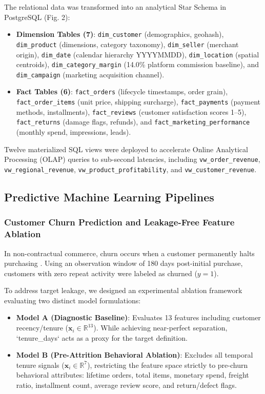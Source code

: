 \documentclass[conference]{IEEEtran}
\begin{document}
The relational data was transformed into an analytical Star Schema in PostgreSQL (Fig. 2):
\begin{itemize}
    \item \textbf{Dimension Tables (7)}: \texttt{dim\_customer} (demographics, geohash), \texttt{dim\_product} (dimensions, category taxonomy), \texttt{dim\_seller} (merchant origin), \texttt{dim\_date} (calendar hierarchy YYYYMMDD), \texttt{dim\_location} (spatial centroids), \texttt{dim\_category\_margin} (14.0\% platform commission baseline), and \texttt{dim\_campaign} (marketing acquisition channel).
    \item \textbf{Fact Tables (6)}: \texttt{fact\_orders} (lifecycle timestamps, order grain), \texttt{fact\_order\_items} (unit price, shipping surcharge), \texttt{fact\_payments} (payment methods, installments), \texttt{fact\_reviews} (customer satisfaction scores 1--5), \texttt{fact\_returns} (damage flags, refunds), and \texttt{fact\_marketing\_performance} (monthly spend, impressions, leads).
\end{itemize}
Twelve materialized SQL views were deployed to accelerate Online Analytical Processing (OLAP) queries to sub-second latencies, including \texttt{vw\_order\_revenue}, \texttt{vw\_regional\_revenue}, \texttt{vw\_product\_profitability}, and \texttt{vw\_customer\_revenue}.

\subsection{Predictive Machine Learning Pipelines}

\subsubsection{Customer Churn Prediction and Leakage-Free Feature Ablation}
In non-contractual commerce, churn occurs when a customer permanently halts purchasing . Using an observation window of 180 days post-initial purchase, customers with zero repeat activity were labeled as churned ($y=1$).

To address target leakage, we designed an experimental ablation framework evaluating two distinct model formulations:
\begin{itemize}
    \item \textbf{Model A (Diagnostic Baseline)}: Evaluates 13 features including customer recency/tenure ($\mathbf{x}_i \in \mathbb{R}^{13}$). While achieving near-perfect separation, `tenure_days` acts as a proxy for the target definition.
    \item \textbf{Model B (Pre-Attrition Behavioral Ablation)}: Excludes all temporal tenure signals ($\mathbf{x}_i \in \mathbb{R}^{7}$), restricting the feature space strictly to pre-churn behavioral attributes: lifetime orders, total items, monetary spend, freight ratio, installment count, average review score, and return/defect flags.
\end{itemize}
\end{document}
